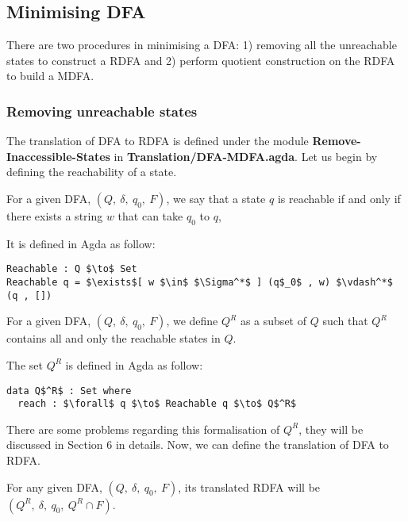 \subsection{Minimising DFA}
\par There are two procedures in minimising a DFA: 1) removing all the
unreachable states to construct a RDFA and 2) perform quotient
construction on the RDFA to build a MDFA. 

\subsubsection{Removing unreachable states}
\par The translation of DFA to RDFA is defined under the module
\textbf{Remove-Inaccessible-States} in
\textbf{Translation/DFA-MDFA.agda}. Let us begin by defining the
reachability of a state.

\begin{defn}
\noindent For a given DFA, \((Q,\ \delta,\ q_0,\ F)\), we say that a state \(q\) is reachable if and
only if there exists a string \(w\) that can take \(q_0\) to \(q\), 
\end{defn} 

\par It is defined in Agda as follow:
\begin{lstlisting}[mathescape=true,xleftmargin=.3\textwidth]
Reachable : Q $\to$ Set
Reachable q = $\exists$[ w $\in$ $\Sigma^*$ ] (q$_0$ , w) $\vdash^*$ (q , [])
\end{lstlisting}

\begin{defn}
\noindent For a given DFA, \((Q,\ \delta,\ q_0,\ F)\), we define \(Q^R\) as a
subset of \(Q\) such that \(Q^R\) contains all and only the reachable states in \(Q\). 
\end{defn}

\par The set \(Q^R\) is defined in Agda as follow:
\begin{lstlisting}[mathescape=true,xleftmargin=.3\textwidth]
data Q$^R$ : Set where
  reach : $\forall$ q $\to$ Reachable q $\to$ Q$^R$
\end{lstlisting}

\par There are some problems regarding this formalisation of \(Q^R\),
they will be discussed in Section 6 in details. Now, we can define the
translation of DFA to RDFA.

\begin{defn}
\label{defn:unreachable}
\noindent For any given DFA, \((Q,\ \delta,\ q_0,\ F)\), its
translated RDFA will be \((Q^R,\ \delta,\ q_0,\ Q^R \cap F)\). 
\end{defn}

